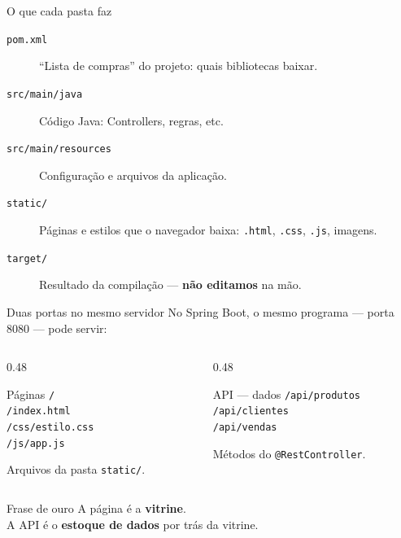 \documentclass[aspectratio=169,11pt]{beamer}
\begin{document}
\begin{frame}{O que cada pasta faz}
  \begin{description}
    \item[\texttt{pom.xml}] ``Lista de compras'' do projeto:
      quais bibliotecas baixar.
    \item[\texttt{src/main/java}] Código Java: Controllers, regras, etc.
    \item[\texttt{src/main/resources}] Configuração e arquivos da aplicação.
    \item[\texttt{static/}] Páginas e estilos que o navegador baixa:
      \texttt{.html}, \texttt{.css}, \texttt{.js}, imagens.
    \item[\texttt{target/}] Resultado da compilação --- \textbf{não editamos}
      na mão.
  \end{description}
\end{frame}

\begin{frame}{Duas portas no mesmo servidor}
  No Spring Boot, o mesmo programa --- porta 8080 --- pode servir:

  \vspace{0.6em}
  \begin{columns}[T]
    \begin{column}{0.48\textwidth}
      \begin{block}{Páginas}
        \texttt{/}\\
        \texttt{/index.html}\\
        \texttt{/css/estilo.css}\\
        \texttt{/js/app.js}
      \end{block}
      Arquivos da pasta \texttt{static/}.
    \end{column}
    \begin{column}{0.48\textwidth}
      \begin{block}{API --- dados}
        \texttt{/api/produtos}\\
        \texttt{/api/clientes}\\
        \texttt{/api/vendas}
      \end{block}
      Métodos do \texttt{@RestController}.
    \end{column}
  \end{columns}

  \vspace{0.8em}
  \begin{alertblock}{Frase de ouro}
    A página é a \textbf{vitrine}.\\
    A API é o \textbf{estoque de dados} por trás da vitrine.
  \end{alertblock}
\end{frame}
\end{document}
